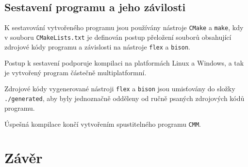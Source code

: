 \documentclass[12pt, a4paper]{article}
\let\oldsection\section
\renewcommand\section{\clearpage\oldsection}
\begin{document}
\subsection{Sestavení programu a jeho závilosti}
K sestavování vytvořeného programu jsou používány nástroje \texttt{CMake} a \texttt{make}, kdy v souboru \texttt{CMakeLists.txt} je definován postup přeložení souborů obsahující zdrojové kódy programu a závislosti na nástroje \texttt{flex} a \texttt{bison}.

Postup k sestavení podporuje kompilaci na platformách Linux a Windows, a tak je vytvořený program částečně multiplatformní.

Zdrojové kódy vygenerované nástroji \texttt{flex} a \texttt{bison} jsou umisťovány do složky \texttt{./generated}, aby byly jednoznačně odděleny od ručně psaných zdrojových kódů programu.

Úspešná kompilace končí vytvořením spustitelného programu \texttt{CMM}.



\section{Závěr}	

\end{document}
